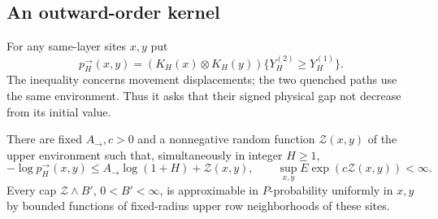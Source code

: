 \subsection{An outward-order kernel}

For any same-layer sites \(x,y\) put
\[
p_H^\to(x,y)=(K_H(x)\otimes K_H(y))\{Y_H^{(2)}\ge Y_H^{(1)}\}.
\]
The inequality concerns movement displacements; the two quenched paths
use the same environment. Thus it asks that their signed physical gap
not decrease from its initial value.

\begin{proposition}\label{kernel-outward-order}
There are fixed \(A_{\to},c>0\) and a nonnegative random function
\(\mathcal Z(x,y)\) of the upper environment such that, simultaneously
in integer \(H\ge1\),
\[
-\log p_H^\to(x,y)\le A_{\to}\log(1+H)+\mathcal Z(x,y),\qquad
\sup_{x,y} E\exp(c\mathcal Z(x,y))<\infty.
\tag{33}\label{eq:33}
\]
Every cap \(\mathcal Z\wedge B'\), \(0<B'<\infty\), is approximable in \(P\)-probability uniformly in \(x,y\) by bounded functions of fixed-radius upper row neighborhoods of these sites.
\end{proposition}

